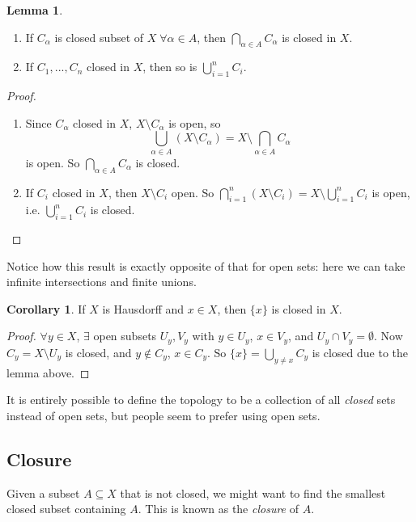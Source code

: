\documentclass[a4paper,11pt]{article}
\theoremstyle{definition}
\newtheorem*{lem}{Lemma}
\newtheorem*{cor}{Corollary}
\numberwithin{equation}{section}
\begin{document}
\begin{lem}
\leavevmode
\begin{enumerate}
    \item If $C_\alpha$ is closed subset of $X\;\forall\alpha\in A$, then $\bigcap\limits_{\alpha\in A} C_\alpha$ is closed in $X$.
    \item If $C_1,...,C_n$ closed in $X$, then so is $\bigcup\limits_{i=1}^nC_i$.
\end{enumerate}
\end{lem}

\begin{proof}
\leavevmode
\begin{enumerate}
    \item Since $C_\alpha$ closed in $X$, $X\setminus C_\alpha$ is open, so 
    \begin{equation}
        \bigcup_{\alpha\in A}(X\setminus C_\alpha) = X\setminus\bigcap_{\alpha\in A} C_\alpha
    \end{equation}
    is open. So $\bigcap\limits_{\alpha\in A} C_\alpha$ is closed.
    \item If $C_i$ closed in $X$, then $X\setminus C_i$ open. So $\bigcap\limits_{i=1}^n (X\setminus C_i) = X\setminus\bigcup\limits^n_{i=1}C_i$ is open, i.e. $\bigcup\limits^n_{i=1}C_i$ is closed.
\end{enumerate}
\end{proof}

Notice how this result is exactly opposite of that for open sets: here we can take infinite intersections and finite unions.

\begin{cor}
If $X$ is Hausdorff and $x\in X$, then $\{x\}$ is closed in $X$.
\end{cor}
\begin{proof}
$\forall y\in X$, $\exists$ open subsets $U_y, V_y$ with $y\in U_y$, $x\in V_y$, and $U_y\cap V_y=\emptyset$. Now $C_y = X\setminus U_y$ is closed, and $y\notin C_y$, $x\in C_y$. So $\{x\} = \bigcup\limits_{y\neq x} C_y$ is closed due to the lemma above.
\end{proof}

It is entirely possible to define the topology to be a collection of all \emph{closed} sets instead of open sets, but people seem to prefer using open sets.

\subsection{Closure}
Given a subset $A\subseteq X$ that is not closed, we might want to find the smallest closed subset containing $A$. This is known as the \emph{closure} of $A$.
\end{document}
